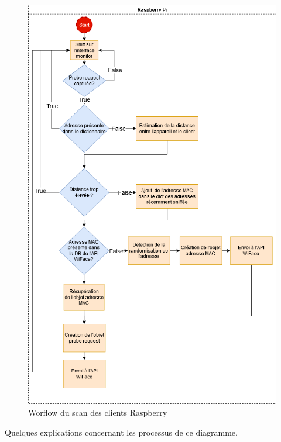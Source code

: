 \begin{figure}[H]
	\centering
	\includegraphics[width=12cm]{images/probe/flowchart_scan_probe.png}
    \caption{Worflow du scan des clients Raspberry}
	\label{fig:worflow-scan}
\end{figure}

Quelques explications concernant les processus de ce diagramme.

